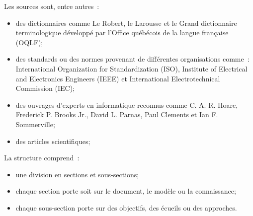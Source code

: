 {Les sources sont, entre autres~:
\begin{itemize}[leftmargin=*]
    \item des dictionnaires comme Le Robert, le Larousse et le Grand dictionnaire terminologique développé par l'Office québécois de la langue française (OQLF);
    \item des standards ou des normes provenant de différentes organisations comme~: International Organization for Standardization (ISO), Institute of Electrical and Electronics Engineers (IEEE) et International Electrotechnical Commission (IEC);
    \item des ouvrages d'experts en informatique reconnus comme C. A. R. Hoare, Frederick P. Brooks Jr., David L. Parnas, Paul Clements et Ian F. Sommerville;
    \item des articles scientifiques;
\end{itemize}

La structure comprend~: 
\begin{itemize}[leftmargin=*]
    \item une division en sections et sous-sections;
    \item chaque section porte soit sur le document, le modèle ou la connaissance;
    \item chaque sous-section porte sur des objectifs, des écueils ou des approches. 
\end{itemize}
\leavevmode\vspace{-\baselineskip}
}{}










